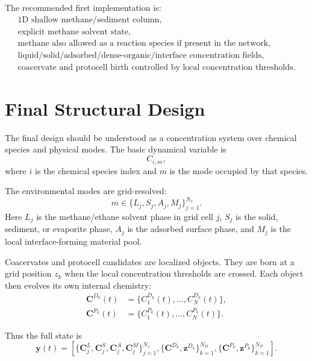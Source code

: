 \documentclass[11pt]{article}
\begin{document}
The recommended first implementation is:
\begin{equation}
\begin{gathered}
\text{1D shallow methane/sediment column},\\
\text{explicit methane solvent state},\\
\text{methane also allowed as a reaction species if present in the network},\\
\text{liquid/solid/adsorbed/dense-organic/interface concentration fields},\\
\text{coacervate and protocell birth controlled by local concentration thresholds}.
\end{gathered}
\end{equation}

\section{Final Structural Design}

The final design should be understood as a concentration system over chemical species and physical modes. The basic dynamical variable is
\begin{equation}
C_{i,m},
\end{equation}
where $i$ is the chemical species index and $m$ is the mode occupied by that species.

The environmental modes are grid-resolved:
\begin{equation}
m\in\{L_j,S_j,A_j,M_j\}_{j=1}^{N_z}.
\end{equation}
Here $L_j$ is the methane/ethane solvent phase in grid cell $j$, $S_j$ is the solid, sediment, or evaporite phase, $A_j$ is the adsorbed surface phase, and $M_j$ is the local interface-forming material pool.

Coacervates and protocell candidates are localized objects. They are born at a grid position $z_k$ when the local concentration thresholds are crossed. Each object then evolves its own internal chemistry:
\begin{align}
\mathbf{C}^{D_k}(t) &= \{C_1^{D_k}(t),\ldots,C_N^{D_k}(t)\},\\
\mathbf{C}^{P_k}(t) &= \{C_1^{P_k}(t),\ldots,C_N^{P_k}(t)\}.
\end{align}

Thus the full state is
\begin{equation}
\mathbf{y}(t)
=
\left[
\{\mathbf{C}^{L}_j,\mathbf{C}^{S}_j,\mathbf{C}^{A}_j,\mathbf{C}^{M}_j\}_{j=1}^{N_z},
\{\mathbf{C}^{D_k},\mathbf{z}^{D_k}\}_{k=1}^{N_D},
\{\mathbf{C}^{P_k},\mathbf{z}^{P_k}\}_{k=1}^{N_P}
\right].
\end{equation}
\end{document}
